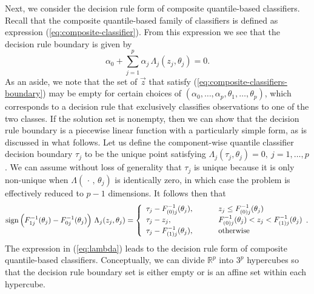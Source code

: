 
Next, we consider the decision rule form of composite quantile-based
classifiers.  Recall that the composite quantile-based family of classifiers is
defined as expression (\ref{eq:composite-classifier}).  From this expression we
see that the decision rule boundary is given by
\begin{equation}
  \label{eq:composite-classifiers-boundary}
  \alpha_0 + \sum_{j=1}^p \alpha_j\, \Lambda_j (z_j, \theta_j) = 0.
\end{equation}
As an aside, we note that the set of $\vec{z}$ that satisfy
(\ref{eq:composite-classifiers-boundary}) may be empty for certain choices of
$(\alpha_0, \dots, \alpha_p, \allowbreak\theta_1, \allowbreak\dots,
\allowbreak\theta_p)$, which corresponds to a decision rule that exclusively
classifies observations to one of the two classes.  If the solution set is
nonempty, then we can show that the decision rule boundary is a piecewise linear
function with a particularly simple form, as is discussed in what follows.  Let
us define the component-wise quantile classifier decision boundary $\tau_j$ to
be the unique point satisfying
$\Lambda_j (\tau_j, \theta_j) = 0,~ j = 1, \dots, p$.  We can assume without
loss of generality that $\tau_j$ is unique because it is only non-unique when
$\Lambda(\,\cdot\,,\, \theta_j)$ is identically zero, in which case the problem
is effectively reduced to $p - 1$ dimensions.  It follows then that
\begin{equation}
  \label{eq:lambda}
  \operatorname{sign}\Big(F_{1j}^{-1}(\theta_j) - F_{0j}^{-1}(\theta_j)\Big)~ \Lambda_j(z_j, \theta_j) =
  \left\{
    \begin{array}{lll}
      \tau_j - F_{(0)j}^{-1}(\theta_j),
      & \hspace{5mm}
      & z_j \leq F_{(0)j}^{-1}(\theta_j) \\[0.5ex]
      \tau_j - z_j,
      & \hspace{5mm}
      & F_{(0)j}^{-1}(\theta_j) < z_j < F_{(1)j}^{-1}(\theta_j) \\[0.5ex]
      \tau_j - F_{(1)j}^{-1} (\theta_j),
      & \hspace{5mm}
      & \text{otherwise} \\
    \end{array}.
  \right.
\end{equation}
The expression in (\ref{eq:lambda}) leads to the decision rule form of composite
quantile-based classifiers.  Conceptually, we can divide $\mathbb{R}^p$ into
$3^p$ hypercubes so that the decision rule boundary set is either empty or is an
affine set within each hypercube.


